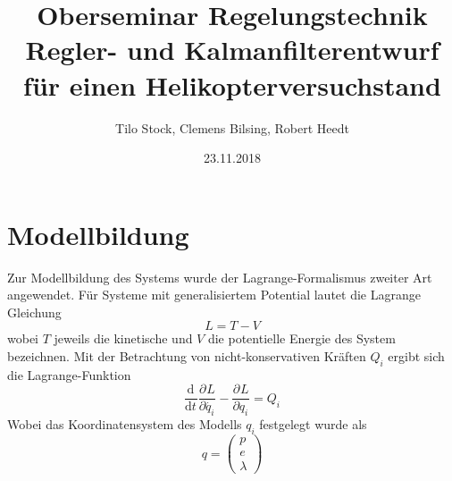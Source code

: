 \documentclass{article}
\title{Oberseminar Regelungstechnik \\ Regler- und Kalmanfilterentwurf für einen Helikopterversuchstand}
\author{Tilo Stock, Clemens Bilsing, Robert Heedt}
\date {23.11.2018}
\newcommand{\partiell}[3][]{\frac{\partial^{#1}#2}{\partial{#3}^{#1}}}
\newcommand{\diff}[3][]{\frac{\mathrm{d}^{#1}#2}{\mathrm{d}{#3}^{#1}}}
\begin{document}
	\maketitle
	\tableofcontents
	\newpage
	\section{Modellbildung}
	Zur Modellbildung des Systems wurde der Lagrange-Formalismus zweiter Art angewendet. Für Systeme mit generalisiertem Potential lautet die Lagrange Gleichung 
	\begin{equation}
	L = T -V
	\end{equation}
	wobei $T$ jeweils die kinetische und $V$ die potentielle Energie des System bezeichnen.
	Mit der Betrachtung von nicht-konservativen Kräften $Q_i$ ergibt sich die Lagrange-Funktion
	\begin{equation}\label{eq:lagrange}
	\diff{}{t} \partiell{L}{\dot{q_i}} - \partiell{L}{q_i}=Q_i
	\end{equation}
	Wobei das Koordinatensystem des Modells $q_i$ festgelegt wurde als
	\begin{equation}
	q = \begin{pmatrix}
	p\\e\\\lambda
	\end{pmatrix}
	\end{equation}
\end{document}
